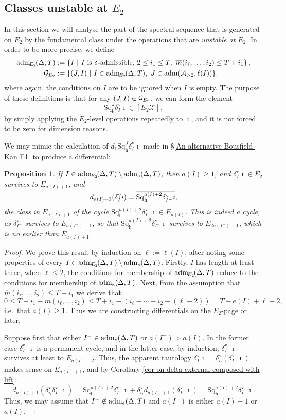 \documentclass[11pt]{amsart} \renewcommand{\baselinestretch}{1.2}
\theoremstyle{plain}
\newtheorem{prop}[thm]{Proposition}
\numberwithin{equation}{section} %
\theoremstyle{plain}
\newtheorem{prop}[thm]{Proposition}
\numberwithin{equation}{chapter} %
\newcommand{\calA}{\mathcal{A}}
\newcommand{\calg}{\mathcal{G}}
\newcommand{\calx}{\mathcal{X}}
\newcommand{\minDimP}{\overline{m}}
\newcommand{\minDimDelta}{m}
\newcommand{\Sq}{\mathrm{Sq}}
\newcommand{\LieSteen}{\calA}
\newcommand{\aDTEtwo}{\mathrm{adm}_{\!\smash{E_2}\!}(\Delta,T)}
\newcommand{\calgEtwo}{\calg_{\smash{E_2}}}
\newcommand{\aDTe}{\mathrm{adm}_{\smash{e}}(\Delta,T)}
\newcommand{\aS}[2][1]{\mathrm{adm}(\LieSteen_{>#1},#2)}
\newcommand{\E}[5]{[E^{#1}_{#2}#3]^{#4}_{#5}}
\newcommand{\uver}{^\mathrm{v}}
\newcommand{\dhor}{_\mathrm{h}}
\newcommand{\Sqh}{\mathrm{Sq}\dhor}
\newcommand{\deltav}{\delta\uver}
\newcommand{\SubsectionOrSection}[1]{\subsection{#1}}
\begin{document}
\begin{The Bousfield-Kan spectral sequence for a sphere}
\SubsectionOrSection{Classes unstable at $E_2$}
\label{Classes unstable at E2}
In this section we will analyse the part of the spectral sequence that is generated on $E_2$ by the fundamental class under the operations that are \emph{unstable at $E_2$}. In order to be more precise, we define
\begin{alignat*}{2}
\aDTEtwo&:=\left\{I\ \middle|\ \textup{$I$ is $\delta$-admissible, }2\leq i_1\leq T,
\ \minDimP(i_{\ell},\ldots,i_2)\leq T+i_1\right\};\\
\calgEtwo&:=\{(J,I)\ |\ I\in \aDTEtwo,\ J\in \aS[2]{\ell (I)}\}.
\end{alignat*}
where again, the conditions on $I$ are to be ignored when $I $ is empty.
The purpose of these definitions is that for any $(J,I)\in \calgEtwo$, we can form the element
\[\Sqh^{J}\deltav_{I}\imath\in \E{}{2}{\calx}{}{},\]
by simply applying the $E_2$-level operations repeatedly to $\imath$, and it is not forced to be zero for dimension reasons.

We may mimic the calculation of $d_1\Sqh^J\deltav_I\imath$ made in \S\ref{An alternative Bousfield-Kan E1} to produce a differential:
\begin{prop}
If $I\in \aDTEtwo \setminus\aDTe$, then $a(I)\geq1$, and $\deltav_I\imath\in E_2$  survives to $E_{a(I)+1}$, and
\[
d_{a(I)+1}(\deltav_I\imath)=\smash{ \overline{\Sqh^{a(I)+2}\deltav_{I^{-}}\imath}},
\]
the class in $E_{a(I)+1}$ of the cycle $\Sqh^{a(I)+2}\deltav_{I^{-}}\imath\in E_{a(I)}$. This is indeed a cycle, as $\deltav_{I^{-}}$ survives to $E_{a(I^-)+1}$, so that $\Sqh^{a(I)+2}\deltav_{I^{-}}\imath$ survives to $E_{2a(I^{-})+1}$, which is no earlier than $E_{a(I)+1}$.
\end{prop}
\begin{proof}
We prove this result by induction on $\ell:=\ell(I)$, after noting some properties of every $I\in \aDTEtwo \setminus\aDTe$. Firstly, $I$ has length at least three, when $\ell\leq 2$, the conditions for membership of $\aDTEtwo $ reduce to the conditions for membership of $\aDTe$. Next, from the assumption that $\minDimP(i_{\ell},\ldots,i_2)\leq T+i_1$ we derive that
\[0\leq T+i_1-\minDimP(i_{\ell},\ldots,i_2)\leq T+i_1-(i_{\ell}-\cdots-i_2-(\ell-2))=T-e(I)+\ell-2,\]
i.e.\ that $a(I)\geq1$. Thus we are constructing differentials on the $E_2$-page or later.

Suppose first that either $I^-\in \aDTe$ or $a(I^-)> a(I)$. In the former case $\deltav_{I^-}\imath$ is a permanent cycle, and in the latter case, by induction, $\deltav_{I^-}\imath$ survives at least to $E_{a(I)+2}$. Thus, the apparent tautology
 $\deltav_I\imath = \deltav_{i_l}(\deltav_{I^-}\imath)$
makes sense on $E_{a(I)+1}$, and by Corollary \ref{cor on delta external composed with lift}:
\[d_{a(I)+1}(\deltav_{i_l}\deltav_{I^-}\imath)
=
\Sqh^{a(I)+2}\deltav_{I^-}\imath
+
\deltav_{i_l}d_{a(I)+1}(\deltav_{I^-}\imath)
=
\Sqh^{a(I)+2}\deltav_{I^-}\imath
.
\]
Thus, we may assume that $I^-\notin \aDTe$ and $a(I^-)$ is either $a(I)-1$ or $a(I)$.


\end{proof}
\end{The Bousfield-Kan spectral sequence for a sphere}
\end{document}
